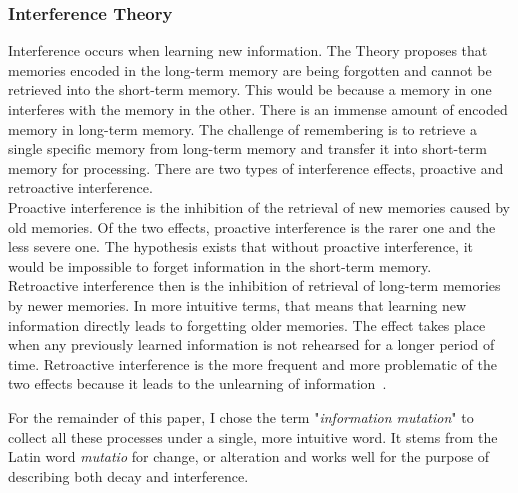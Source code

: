 \subsubsection{Interference Theory}
Interference occurs when learning new information. The Theory proposes that memories encoded in the long-term memory are being forgotten and cannot be retrieved into the short-term memory. This would be because a memory in one interferes with the memory in the other. There is an immense amount of encoded memory in long-term memory. The challenge of remembering is to retrieve a single specific memory from long-term memory and transfer it into short-term memory for processing. There are two types of interference effects, proactive and retroactive interference.~\cite{Edwards2010}\\
Proactive interference is the inhibition of the retrieval of new memories caused by old memories. Of the two effects, proactive interference is the rarer one and the less severe one. The hypothesis exists that without proactive interference, it would be impossible to forget information in the short-term memory.~\cite{Keppel1962}\\
Retroactive interference then is the inhibition of retrieval of long-term memories by newer memories. In more intuitive terms, that means that learning new information directly leads to forgetting older memories. The effect takes place when any previously learned information is not rehearsed for a longer period of time. Retroactive interference is the more frequent and more problematic of the two effects because it leads to the unlearning of information~\cite{Melton1941}.~\cite{Edwards2010}\newline

For the remainder of this paper, I chose the term "\textit{information mutation}" to collect all these processes under a single, more intuitive word. It stems from the Latin word \textit{mutatio} for change, or alteration and works well for the purpose of describing both decay and interference. 
